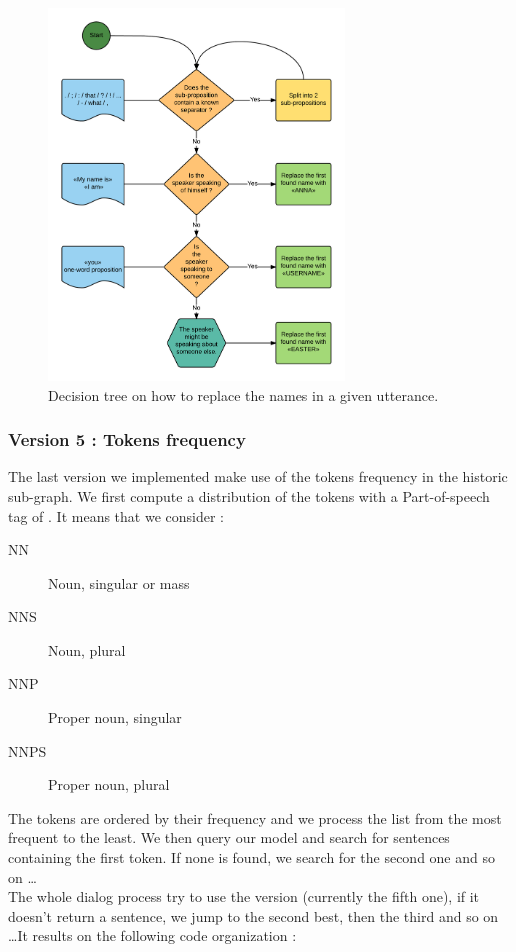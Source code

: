 \begin{figure}[!h]
\begin{center}
\includegraphics[width=0.70\textwidth]{./img/DecisionNames.png}
\end{center}
\caption{Decision tree on how to replace the names in a given utterance.}
\label{fig:NamesDecisionTree}
\end{figure}

\subsubsection{Version 5 : Tokens frequency} %
\label{ssub:version_5_tokens_frequency}
The last version we implemented make use of the tokens frequency in the historic sub-graph. We first compute a distribution of the tokens with a Part-of-speech tag of . It means that we consider :
\begin{description}
    \item[NN] Noun, singular or mass
    \item[NNS] Noun, plural
    \item[NNP] Proper noun, singular
    \item[NNPS] Proper noun, plural
\end{description}
The tokens are ordered by their frequency and we process the list from the most frequent to the least. We then query our model and search for sentences containing the first token. If none is found, we search for the second one and so on \dots \\

The whole dialog process try to use the  version (currently the fifth one), if it doesn't return a sentence, we jump to the second best, then the third and so on \dots It results on the following code organization :

